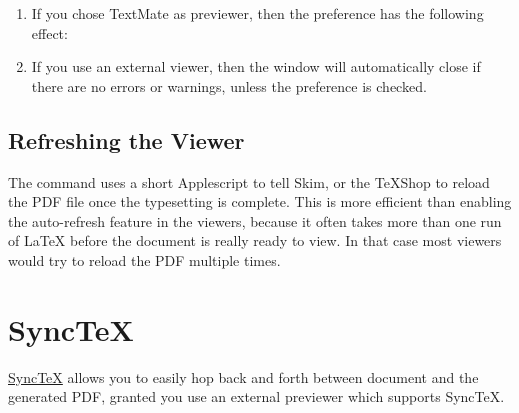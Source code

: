 \documentclass[11pt, x11names]{article}
\begin{document}
\begin{enumerate}

  \item If you chose TextMate as previewer, then the  preference has the following effect:


  \item If you use an external viewer, then the  window will automatically close if there are no errors or warnings, unless the  preference is checked.

\end{enumerate}

\subsection{Refreshing the Viewer}

The  command uses a short Applescript to tell Skim, or the TeXShop to reload the PDF file once the typesetting is complete. This is more efficient than enabling the auto-refresh feature in the viewers, because it often takes more than one run of LaTeX before the document is really ready to view. In that case most viewers would try to reload the PDF multiple times.

\section{SyncTeX}

\href{http://mactex-wiki.tug.org/wiki/index.php/SyncTeX}{SyncTeX} allows you to easily hop back and forth between document and the generated PDF, granted you use an external previewer which supports SyncTeX.
\end{document}
